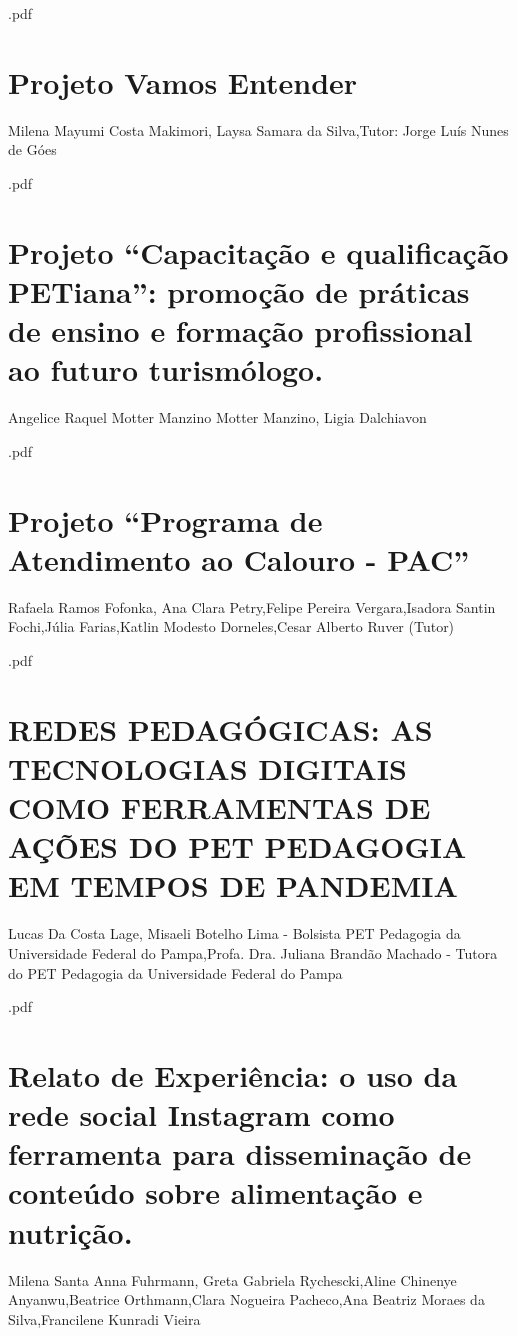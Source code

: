 

.pdf\section{Projeto Vamos Entender}

Milena Mayumi Costa Makimori, Laysa Samara da Silva,Tutor: Jorge Luís Nunes de Góes



.pdf\section{Projeto “Capacitação e qualificação PETiana”: promoção de práticas de ensino e formação  profissional ao futuro turismólogo. }

Angelice Raquel Motter Manzino Motter Manzino, Ligia Dalchiavon



.pdf\section{Projeto “Programa de Atendimento ao Calouro - PAC”}

Rafaela Ramos Fofonka, Ana Clara Petry,Felipe Pereira Vergara,Isadora Santin Fochi,Júlia Farias,Katlin Modesto Dorneles,Cesar Alberto Ruver (Tutor)



.pdf\section{REDES PEDAGÓGICAS: AS TECNOLOGIAS DIGITAIS COMO FERRAMENTAS DE AÇÕES DO PET PEDAGOGIA EM TEMPOS DE PANDEMIA}

Lucas Da Costa Lage, Misaeli Botelho Lima - Bolsista PET Pedagogia da Universidade Federal do Pampa,Profa. Dra. Juliana Brandão Machado - Tutora do PET Pedagogia da Universidade Federal do Pampa



.pdf\section{Relato de Experiência: o uso da rede social Instagram como ferramenta para disseminação de conteúdo sobre alimentação e nutrição.}

Milena Santa Anna Fuhrmann, Greta Gabriela Rychescki,Aline Chinenye Anyanwu,Beatrice Orthmann,Clara Nogueira Pacheco,Ana Beatriz Moraes da Silva,Francilene Kunradi Vieira

